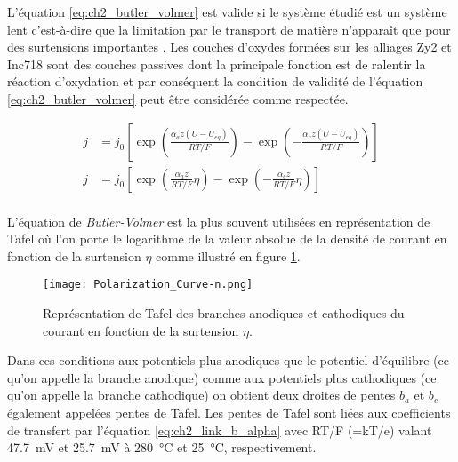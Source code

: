 \begin{refsection}
    L'équation \ref{eq:ch2_butler_volmer} est valide si le système étudié 
    est un système lent c'est-à-dire que la limitation par le transport de matière n'apparaît que pour des surtensions
    importantes \citep{Bard2001, Diard1996}.
    Les couches d'oxydes formées sur les alliages Zy2 et Inc718 sont des couches passives dont la principale
    fonction est de ralentir la réaction d'oxydation et par conséquent la condition de validité de l'équation
    \ref{eq:ch2_butler_volmer} peut être considérée comme respectée.

    \begin{equation}
        \begin{split}
            j &= j_0 \left[ \exp\left(\frac{\alpha _az(U-U_{eq})}{RT/F}\right) 
            - \exp\left(-\frac{\alpha _cz(U-U_{eq})}{RT/F}\right) \right]\\
            j &= j_0 \left[ \exp\left(\frac{\alpha _az}{RT/F}\eta \right) 
            - \exp\left(-\frac{\alpha _cz}{RT/F}\eta \right) \right]\\
        \end{split}    
    \label{eq:ch2_butler_volmer}
    \end{equation}
    
    L'équation de \emph{Butler-Volmer} est la plus souvent utilisées en représentation de Tafel où l'on porte le
    logarithme de la valeur absolue de la densité de courant en fonction de la surtension $\eta$ comme illustré en
    figure \ref{fig:polarization_curve_n}. 
    
    \begin{figure}[H]
        \centering
        \texttt{[image: Polarization\_Curve-n.png]}
        \caption{Représentation de Tafel des branches anodiques et cathodiques du courant en fonction de la surtension $\eta$.}
        \label{fig:polarization_curve_n}
    \end{figure}
    
    Dans ces conditions
    aux potentiels plus anodiques que le potentiel d'équilibre (ce qu'on appelle la branche anodique) comme aux
    potentiels plus cathodiques (ce qu'on appelle la branche cathodique) on obtient deux droites de pentes $b_a$ et $b_c$
    également appelées pentes de Tafel. Les pentes de Tafel sont liées aux coefficients de transfert par
    l'équation \ref{eq:ch2_link_b_alpha} avec RT/F (=kT/e) valant \SI{47.7}{\milli\volt} et \SI{25.7}{\milli\volt} 
    à \SI{280}{\degreeCelsius} et \SI{25}{\degreeCelsius}, respectivement.


\end{refsection}
